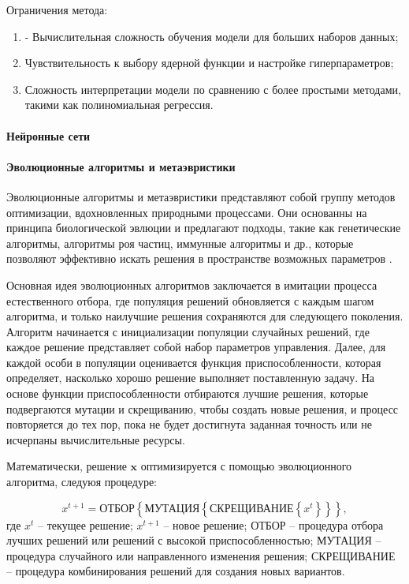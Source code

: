 Ограничения метода:

\begin{enumerate}
    \item - Вычислительная сложность обучения модели для больших наборов данных;
    \item Чувствительность к выбору ядерной функции и настройке гиперпараметров;
    \item Сложность интерпретации модели по сравнению с более простыми методами, такими как полиномиальная регрессия.
\end{enumerate}

\paragraph{Нейронные сети}\label{sec:ch4/sec3/subsec1/subsubsec5}

\paragraph{Эволюционные алгоритмы и метаэвристики}\label{sec:ch4/sec3/subsec1/subsubsec6}
Эволюционные алгоритмы и метаэвристики представляют собой группу методов оптимизации,
вдохновленных природными процессами.
Они основанны на принципа биологической эвлюции и предлагают подходы, такие как генетические алгоритмы,
алгоритмы роя частиц, иммунные алгоритмы и др., которые позволяют эффективно искать решения
в пространстве возможных параметров \cite{zhang2015comparision}.

Основная идея эволюционных алгоритмов заключается в имитации процесса естественного отбора,
где популяция решений обновляется с каждым шагом алгоритма, и только наилучшие решения
сохраняются для следующего поколения. Алгоритм начинается с инициализации популяции случайных
решений, где каждое решение представляет собой набор параметров управления. Далее, для каждой
особи в популяции оценивается функция приспособленности, которая определяет, насколько хорошо
решение выполняет поставленную задачу. На основе функции приспособленности отбираются лучшие
решения, которые подвергаются мутации и скрещиванию, чтобы создать новые решения, и процесс
повторяется до тех пор, пока не будет достигнута заданная точность или не исчерпаны
вычислительные ресурсы.

Математически, решение $\mathbf{x}$ оптимизируется с помощью эволюционного алгоритма, следуюя
процедуре:

\begin{equation}
    x^{t+1} = \text{ОТБОР} \left\{
    \text{МУТАЦИЯ} \left\{
    \text{СКРЕЩИВАНИЕ} \left\{
    x^t
    \right\}
    \right\}
    \right\},
\end{equation}
где $x^t$ -- текущее решение;
$x^{t+1}$ -- новое решение;
$\text{ОТБОР}$ -- процедура отбора лучших решений или решений с высокой приспособленностью;
$\text{МУТАЦИЯ}$ -- процедура случайного или направленного изменения решения;
$\text{СКРЕЩИВАНИЕ}$ -- процедура комбинирования решений для создания новых вариантов.

